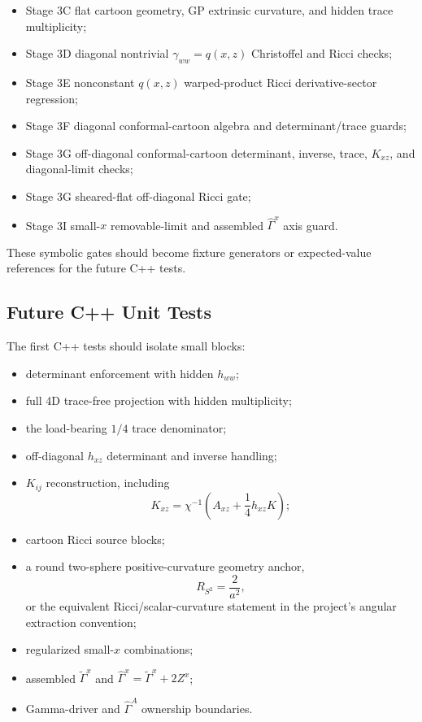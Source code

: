 \documentclass[11pt]{article}
\begin{document}
\begin{itemize}[leftmargin=2em]
\item Stage 3C flat cartoon geometry, GP extrinsic curvature, and hidden trace
  multiplicity;
\item Stage 3D diagonal nontrivial \(\gamma_{ww}=q(x,z)\) Christoffel and
  Ricci checks;
\item Stage 3E nonconstant \(q(x,z)\) warped-product Ricci derivative-sector
  regression;
\item Stage 3F diagonal conformal-cartoon algebra and determinant/trace
  guards;
\item Stage 3G off-diagonal conformal-cartoon determinant, inverse, trace,
  \(K_{xz}\), and diagonal-limit checks;
\item Stage 3G sheared-flat off-diagonal Ricci gate;
\item Stage 3I small-\(x\) removable-limit and assembled
  \(\hat{\Gamma}^{x}\) axis guard.
\end{itemize}

These symbolic gates should become fixture generators or expected-value
references for the future C++ tests.

\subsection{Future C++ Unit Tests}

The first C++ tests should isolate small blocks:

\begin{itemize}[leftmargin=2em]
\item determinant enforcement with hidden \(h_{ww}\);
\item full 4D trace-free projection with hidden multiplicity;
\item the load-bearing \(1/4\) trace denominator;
\item off-diagonal \(h_{xz}\) determinant and inverse handling;
\item \(K_{ij}\) reconstruction, including
  \[
    K_{xz}=\chi^{-1}\left(A_{xz}+\frac14 h_{xz}K\right);
  \]
\item cartoon Ricci source blocks;
\item a round two-sphere positive-curvature geometry anchor,
  \[
    R_{S^2}=\frac{2}{a^2},
  \]
  or the equivalent Ricci/scalar-curvature statement in the project's angular
  extraction convention;
\item regularized small-\(x\) combinations;
\item assembled \(\tilde{\Gamma}^{x}\) and
  \(\hat{\Gamma}^{x}=\tilde{\Gamma}^{x}+2Z^{x}\);
\item Gamma-driver and \(\hat{\Gamma}^{A}\) ownership boundaries.
\end{itemize}
\end{document}
